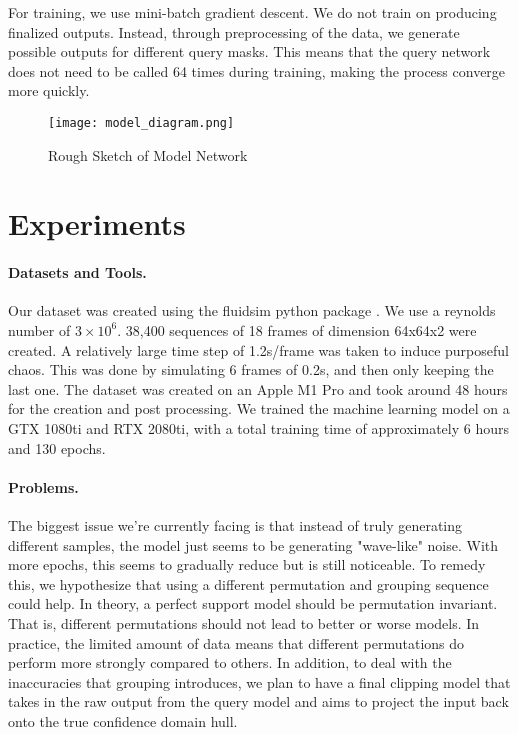 \documentclass{article}
\begin{document}
    For training, we use mini-batch gradient descent. We do not train on producing finalized outputs. Instead, through preprocessing of the data, we generate possible outputs for different query masks. This means that the query network does not need to be called 64 times during training, making the process converge more quickly.

    \begin{figure}
        \centering
        \caption{Rough Sketch of Model Network}
        \texttt{[image: model\_diagram.png]}
    \end{figure}

    \section{Experiments}
    \paragraph{Datasets and Tools.}
    Our dataset was created using the fluidsim python package \cite{fluiddyn, fluidfft, fluidsim}. We use a reynolds number of $3 \times 10^6$. 38,400 sequences of 18 frames of dimension 64x64x2 were created. A relatively large time step of 1.2s/frame was taken to induce purposeful chaos. This was done by simulating 6 frames of 0.2s, and then only keeping the last one. The dataset was created on an Apple M1 Pro and took around 48 hours for the creation and post processing. We trained the machine learning model on a GTX 1080ti and RTX 2080ti, with a total training time of approximately 6 hours and 130 epochs.

    \paragraph{Problems.}
    The biggest issue we're currently facing is that instead of truly generating different samples, the model just seems to be generating "wave-like" noise. With more epochs, this seems to gradually reduce but is still noticeable. To remedy this, we hypothesize that using a different permutation and grouping sequence could help. In theory, a perfect support model should be permutation invariant. That is, different permutations should not lead to better or worse models. In practice, the limited amount of data means that different permutations do perform more strongly compared to others. In addition, to deal with the inaccuracies that grouping introduces, we plan to have a final clipping model that takes in the raw output from the query model and aims to project the input back onto the true confidence domain hull.
\end{document}

